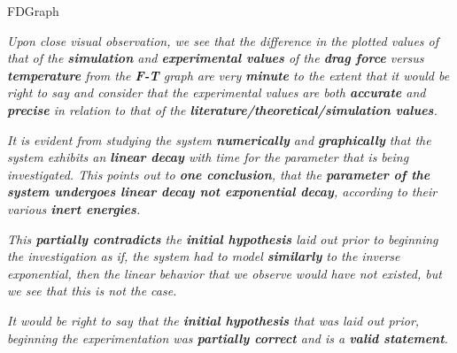             
{FDGraph}
            
\textit{Upon close visual observation, we see that the difference in the plotted values of that of the \textbf{simulation} and \textbf{experimental values} of the \textbf{drag force} versus \textbf{temperature} from the \textbf{F-T} graph are very \textbf{minute} to the extent that it would be right to say and consider that the experimental values are both \textbf{accurate} and \textbf{precise} in relation to that of the \textbf{literature/theoretical/simulation values}.}
        
\textit{It is evident from studying the system \textbf{numerically} and \textbf{graphically} that the system exhibits an \textbf{linear decay} with time for the parameter that is being investigated. This points out to \textbf{one conclusion}, that the \textbf{parameter of the system undergoes linear decay not exponential decay}, according to their various \textbf{inert energies}.}
	 
\textit{This \textbf{partially contradicts} the \textbf{initial hypothesis} laid out prior to beginning the investigation as if, the system had to model \textbf{similarly} to the inverse exponential, then the linear behavior that we observe would have not existed, but we see that this is not the case.}        
        

\textit{It would be right to say that the \textbf{initial hypothesis} that was laid out prior, beginning the experimentation was \textbf{partially correct} and is a \textbf{valid statement}.}        
    
    

